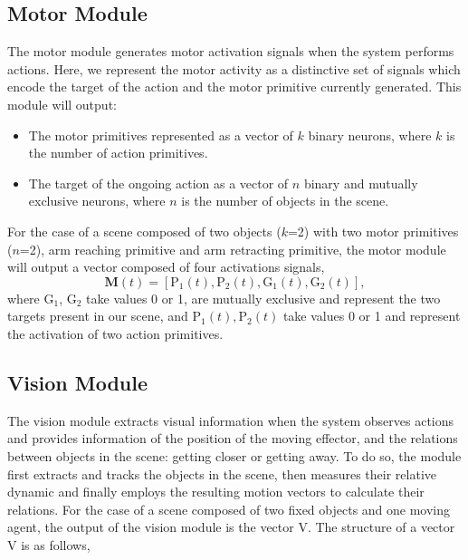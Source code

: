 \documentclass[conference]{IEEEtran}
\begin{document}
\subsection{Motor Module}
The motor module generates motor activation signals when the system performs actions. Here, we represent the motor activity as a distinctive set of signals which encode the target of the action and the motor primitive currently generated. This module will output:
\begin{itemize}
\item The motor primitives represented as a vector of $k$ binary neurons, where $k$ is the number of action primitives.
\item The target of the ongoing action as a vector of $n$ binary and mutually exclusive neurons, where $n$ is the number of objects in the scene.
\end{itemize}
For the case of a scene composed of two objects ($k$=2) with two motor primitives ($n$=2), arm reaching primitive and arm retracting primitive, the motor module will output a vector  composed of four activations signals,
\begin{equation}
	\textbf{M}(t)=[\text{P}_{1}(t), \text{P}_{2}(t), \text{G}_{1}(t), \text{G}_{2}(t)],
\end{equation}
where \(\text{G}_{1}\), \(\text{G}_{2}\) take values 0 or 1, are mutually exclusive and represent the two targets present in our scene, and \(\text{P}_{1}(t), \text{P}_{2}(t)\) take values 0 or 1 and represent the activation of two action primitives.

\subsection{Vision Module}
The vision module extracts visual information when the system observes actions and provides information of the position of the moving effector, and the relations between objects in the scene: getting closer or getting away. To do so, the module first extracts and tracks the objects in the scene, then measures their relative dynamic and finally employs the resulting motion vectors to calculate their relations. For the case of a scene composed of two fixed objects and one moving agent, the output of the vision module is the vector \(\text{V}\). The structure of a vector \(\text{V}\) is as follows,
\end{document}
